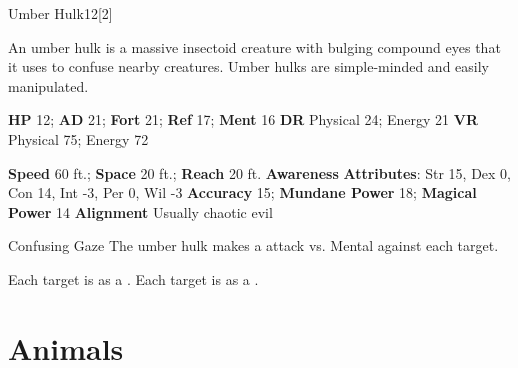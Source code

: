   \begin{monsection}{Umber Hulk}{12}[2]
    \vspace{-1em}\vspace{-1em}
    \vspace{0em}

    
    An umber hulk is a massive insectoid creature with bulging compound eyes that it uses to
    confuse nearby creatures. Umber hulks are simple-minded and easily manipulated.
  
    

    \begin{spellcontent}
      \begin{spelltargetinginfo}
        \pari \textbf{HP} 12;
          \textbf{AD} 21;
          \textbf{Fort} 21;
          \textbf{Ref} 17;
          \textbf{Ment} 16
        \pari \textbf{DR} Physical 24; Energy 21
        \pari \textbf{VR} Physical 75; Energy 72
        
      \end{spelltargetinginfo}
    \end{spellcontent}
    \begin{monsterfooter}
      \pari \textbf{Speed} 60 ft.;
        \textbf{Space} 20 ft.;
        \textbf{Reach} 20 ft.
      \pari \textbf{Awareness} 
      \pari \textbf{Attributes}:
        Str 15, Dex 0,
        Con 14, Int -3,
        Per 0, Wil -3
      \pari \textbf{Accuracy} 15;
        \textbf{Mundane Power} 18;
      \textbf{Magical Power} 14
      \pari \textbf{Alignment} Usually chaotic evil
    \end{monsterfooter}
  \end{monsection}
  \begin{freeability}{Confusing Gaze}
       The umber hulk makes a  attack
        vs. Mental against each target.
    
    \hit Each target is  as a .
    \crit Each target is  as a .
    \end{freeability}
  
        \section{Animals}
      
